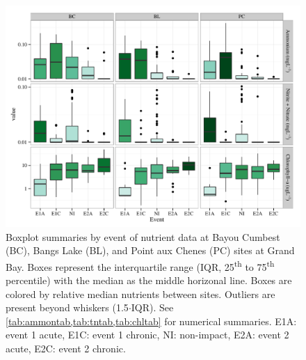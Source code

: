 \documentclass[letterpaper,12pt]{article}\usepackage[]{graphicx}\usepackage[]{color}
\makeatletter
\def\maxwidth{ %
  \ifdim\Gin@nat@width>\linewidth
    \linewidth
  \else
    \Gin@nat@width
  \fi
}
\makeatother
\begin{document}
\begin{figure}[!ht]

{\centering \includegraphics[width=\maxwidth]{figs/boxplt_all-1} 

}

\caption{Boxplot summaries by event of nutrient data at Bayou Cumbest (BC), Bangs Lake (BL), and Point aux Chenes (PC) sites at Grand Bay.  Boxes represent the interquartile range (IQR, 25\textsuperscript{th} to 75\textsuperscript{th} percentile) with the median as the middle horizonal line.  Boxes are colored by relative median nutrients between sites.  Outliers are present beyond whiskers (1.5$\cdot$IQR). See \cref{tab:ammontab,tab:tntab,tab:chltab} for numerical summaries.  E1A: event 1 acute, E1C: event 1 chronic, NI: non-impact, E2A: event 2 acute, E2C: event 2 chronic.}\label{fig:boxplt_all}
\end{figure}


\clearpage

\end{document}
